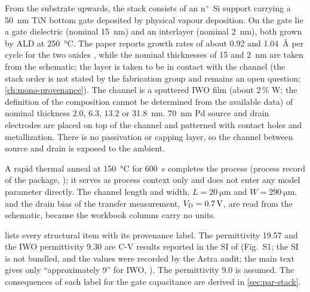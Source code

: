 From the substrate upwards, the stack consists of an n$^+$ Si support carrying a \SI{50}{nm} TiN bottom gate deposited
by physical vapour deposition. On the gate lie a \HfO{} gate dielectric (nominal \SI{15}{nm}) and an \AlO{} interlayer
(nominal \SI{2}{nm}), both grown by ALD at \SI{250}{\celsius}. The paper reports growth rates of about 0.92 and
\SI{1.04}{\angstrom} per cycle for the two oxides \citep[p.~2]{Januar2026}, while the nominal thicknesses of 15 and
\SI{2}{nm} are taken from the schematic; the \AlO{} layer is taken to be in contact with the channel (the stack order is not stated by the fabrication
group and remains an open question; \cref{ch:mono-provenance}). The channel is a sputtered IWO
film (about 2\,\% W; the definition of the composition cannot be determined from the available data) of nominal
thickness 2.0, 6.3, 13.2 or \SI{31.8}{nm}. \SI{70}{nm} Pd source and drain electrodes are placed on top of the channel
and patterned with contact holes and metallization. There is no passivation or capping layer, so the channel between
source and drain is exposed to the ambient.

A rapid thermal anneal at \SI{150}{\celsius} for \SI{600}{s} completes the process (process record of the package,
\protect{}); it serves as process context only and does not enter any model parameter
directly. The channel length and width, $L = \SI{20}{\micro\metre}$ and $W = \SI{290}{\micro\metre}$, and the drain bias
of the transfer measurement, $V_{\mathrm{D}} = \SI{0.7}{V}$, are read from the schematic, because the workbook columns carry no
units.

 lists every structural item with its provenance label. The \HfO{} permittivity 19.57 and the IWO
permittivity 9.30 are C-V results reported in the SI of \citet{Januar2026} (Fig.~S1; the SI is not bundled, and the
values were recorded by the Astra audit; the main text gives only ``approximately 9'' for IWO,
\citealp[p.~2]{Januar2026}). The \AlO{} permittivity 9.0 is assumed. The consequences of each label for the gate
capacitance are derived in \cref{sec:par-stack}.

